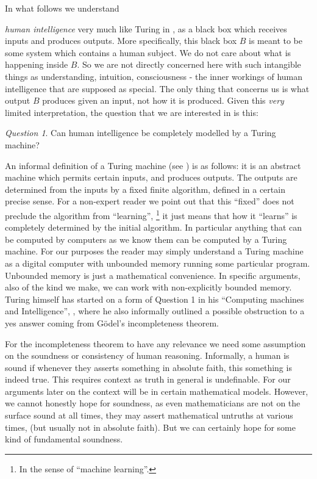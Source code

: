 \documentclass{amsart}  %
\numberwithin{equation}{section}
\theoremstyle{definition}
\theoremstyle{remark}
\newtheorem{question}{Question}
\begin{document}
In what follows we understand {\emph{human intelligence}  very much like Turing in \cite{TuringComputingMachines}, as a black box which receives inputs and produces outputs. More specifically, this black box $B$ is meant to be some system which contains a human subject. We do not care about what is happening inside $B$.
So we are not directly concerned here with such intangible things as understanding, intuition, consciousness - the inner workings of human intelligence that are supposed as special.  The only thing that concerns us is what output $B$ produces given an input, not how it is produced. Given this \emph{very} limited interpretation, the question that we are interested in is this: 
\begin{question} \label{quest1}
 Can human intelligence  be completely modelled by a Turing machine?  
\end{question}
An informal definition of a  Turing machine (see \cite{TuringComputableNumbers}) is as follows: 
it is an abstract machine which permits certain inputs, and produces outputs. The outputs are determined from the inputs by a fixed finite algorithm, defined in a certain precise sense. 
For a non-expert reader we point out that this ``fixed'' does not preclude the algorithm from ``learning'', \footnote {In the sense of ``machine learning''.} it just means that how it ``learns'' is completely determined by the initial algorithm. In particular anything that can be computed by computers as we know them can be computed by a Turing machine.  For our purposes the reader may simply understand a Turing machine as a digital computer with unbounded memory running some particular program. Unbounded memory is just a mathematical convenience.  In specific arguments, also of the kind we make, we can work with non-explicitly bounded memory.  
Turing himself has started on a form of Question 1 in his ``Computing machines and Intelligence'', \cite{TuringComputingMachines}, where he also informally outlined a  possible obstruction to a yes answer coming from G\"odel's incompleteness theorem. 


For the incompleteness theorem to have any relevance we need some assumption on the soundness or consistency of human reasoning.  
Informally, a human is sound if whenever they asserts something in absolute faith, this something is indeed true. This requires context as truth in general is undefinable.  For our arguments later on the context will be in certain mathematical models. 
However, we cannot honestly hope for soundness, as even mathematicians are not on the surface sound at all times, they may assert mathematical untruths at various  times, (but usually not in absolute faith). But we can certainly hope for some kind of fundamental soundness.


}
\end{document}
